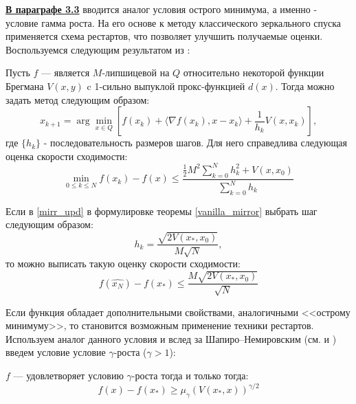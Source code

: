 \underline{\textbf{В параграфе 3.3}} вводится аналог условия острого минимума, а именно - условие гамма роста. На его основе к методу классического зеркального спуска применяется схема рестартов, что позволяет улучшить получаемые оценки.
Воспользуемся следующим результатом из \cite{Lu_2018}:
\begin{theorem} \label{vanilla_mirror}
    Пусть $f$ --- является $M$-липшицевой на $Q$ относительно некоторой функции Брегмана $V(x, y)$ c 1-сильно выпуклой прокс-функцией $d(x)$. Тогда можно задать метод следующим образом:
    \begin{equation} \label{mirr_upd}
        x_{k+1} = \arg \min_{x \in Q} {\left[ f(x_k) + \langle \nabla f(x_k), x - x_k \rangle + \frac{1}{h_k} V(x, x_k)\right]},
    \end{equation}
    где $\{ h_k \}$ - последовательность размеров шагов.
    Для него справедлива следующая оценка скорости сходимости:
    \begin{equation} \label{general_est}
        \min_{0\leq k \leq N} f(x_k) - f(x) \leq \frac{\frac{1}{2} M^2 \sum_{k=0}^N h_k^2 + V(x, x_0)}{\sum_{k=0}^N h_k}
    \end{equation}
\end{theorem}


\begin{remark}
    Если в \eqref{mirr_upd} в формулировке теоремы \ref{vanilla_mirror} выбрать шаг следующим образом:
    \begin{equation} \label{mirr_step}
        h_{k} = \frac{\sqrt{2 V(x_*, x_0)}}{M\sqrt{N}},
    \end{equation}
    то можно выписать такую оценку скорости сходимости:
    \begin{equation} \label{mirr_est}
        f(\widehat{x_N}) - f(x_*) \leq \frac{M\sqrt{2V(x_*, x_0)}}{\sqrt{N}}
    \end{equation}
\end{remark}
Если функция обладает дополнительными свойствами, аналогичными <<острому минимуму>>,  то становится возможным применение техники рестартов. Используем аналог данного условия и вслед за Шапиро–Немировским (см. \cite{shapiro_2005} и \cite{shapiro_2021} ) введем  условие условие $\gamma$-роста ($\gamma > 1$):
\begin{definition}
   $f$ --- удовлетворяет условию $\gamma$-роста тогда и только тогда:
   \begin{equation} \label{gamma-growth}
       f(x) - f(x_*) \geq \mu_{\gamma}(V(x_*,x))^{\gamma/2}
   \end{equation}
\end{definition}


